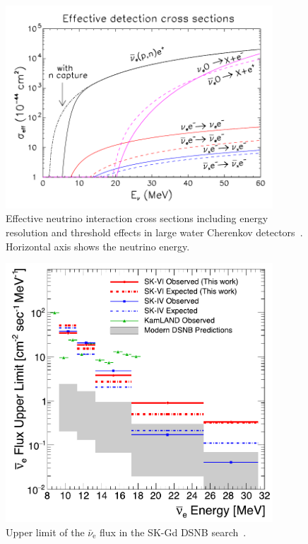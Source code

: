 \begin{figure}[tbp]
	\centering
	\includegraphics[width=10cm]{Figures/Introduction/EffNeuCroSec}
	\caption[Effective neutrino interaction cross sections including energy resolution and threshold effects in large water Cherenkov detectors]{\label{Introd_EffNeuCroSec} Effective neutrino interaction cross sections including energy resolution and threshold effects in large water Cherenkov detectors~\cite{2005Fogli}. Horizontal axis shows the neutrino energy.}
\end{figure}

\begin{figure}[tbp]
	\centering
	\includegraphics[width=10cm]{Figures/Introduction/SK-VI_DSNB_Upper}
	\caption[Upper limit of the $\bar{\nu}_{\text{e}}$ flux in the SK-Gd DSNB search]{\label{Introd_SK-VI_DSNB_Upper} Upper limit of the $\bar{\nu}_{\text{e}}$ flux in the SK-Gd DSNB search~\cite{2023Harada}.}
\end{figure}

